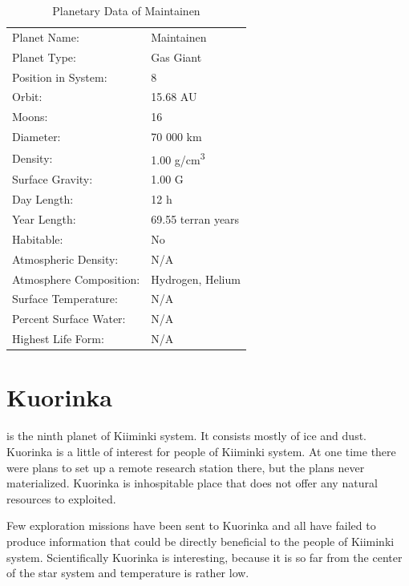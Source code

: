\documentclass{tufte-book}
\begin{document}
\bigskip
\begin{table}
\begin{minipage}{\textwidth}
\begin{center}
\begin{tabular}{ll}
\toprule
Planet Name: & Maintainen \\
Planet Type: & Gas Giant \\
Position in System: & 8 \\
Orbit: & 15.68 AU \\
Moons: & 16 \\
Diameter: & 70 000 km \\
Density: & 1.00 g/cm\textsuperscript{3} \\
Surface Gravity: & 1.00 G \\
Day Length: & 12 h \\
Year Length: & 69.55 terran years \\
Habitable: & No \\
\quad Atmospheric Density: & N/A \\
\quad Atmosphere Composition: & Hydrogen, Helium \\
\quad Surface Temperature: & N/A \\
\quad Percent Surface Water: & N/A \\
\quad Highest Life Form: & N/A \\

\bottomrule
\end{tabular}
\end{center}
\end{minipage}
\caption{Planetary Data of Maintainen}
\end{table}


\section{Kuorinka}

 is the ninth planet of Kiiminki system. It consists
mostly of ice and dust. Kuorinka is a little of interest for people of
Kiiminki system. At one time there were plans to set up a remote research
station there, but the plans never materialized. Kuorinka is inhospitable
place that does not offer any natural resources to exploited.

Few exploration missions have been sent to Kuorinka and all have failed
to produce information that could be directly beneficial to the people 
of Kiiminki system. Scientifically Kuorinka is interesting, because it
is so far from the center of the star system and temperature is rather
low.
\end{document}
